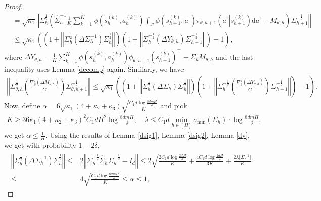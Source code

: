 \documentclass{article}
\numberwithin{equation}{section}
\begin{document}
\begin{proof}
\begin{align*}
    &=\sqrt{\kappa_1}\left\Vert\Sigma_h^{\frac{1}{2}}\left(\widehat{\Sigma}_h^{-1}\frac{1}{K}\sum_{k=1}^K\phi\left(s_h^{(k)},a_h^{(k)}\right)\int_{\mathcal{A}}\phi\left(s_{h+1}^{(k)},a^\prime\right)\pi_{\theta,h+1}\left(a^\prime\left\vert s_{h+1}^{(k)}\right.\right)\mathrm{d}a^\prime- M_{\theta,h}\right)\Sigma_{h+1}^{-\frac{1}{2}}\right\Vert\\
    &\leq\sqrt{\kappa_1}\left(\left(1+\left\Vert\Sigma_h^{\frac{1}{2}}\left(\Delta\Sigma_h^{-1}\right)\Sigma_h^{\frac{1}{2}}\right\Vert\right)\left(1+\left\Vert\Sigma_h^{-\frac{1}{2}}\left(\Delta Y_{\theta,h}\right)\Sigma_{h+1}^{-\frac{1}{2}}\right\Vert\right)-1\right),
\end{align*}
where $\Delta Y_{\theta,h}=\frac{1}{K}\sum_{k=1}^K\phi\left(s_h^{(k)},a_h^{(k)}\right)\phi_{\theta,h+1}\left(s_{h+1}^{(k)}\right)^\top-\Sigma_h M_{\theta,h}$ and the last inequality uses Lemma \ref{decomp} again. Similarly, we have
\begin{align*}
    \left\Vert\Sigma_{\theta,h}^{\frac{1}{2}}\left(\frac{\nabla_\theta^j\left(\Delta M_{\theta,h}\right)}{G}\right)\Sigma_{\theta,h+1}^{-\frac{1}{2}}\right\Vert\leq\sqrt{\kappa_1}\left(\left(1+\left\Vert\Sigma_h^{\frac{1}{2}}\left(\Delta\Sigma_h\right)\Sigma_h^{\frac{1}{2}}\right\Vert\right)\left(1+\left\Vert\Sigma_h^{-\frac{1}{2}}\left(\frac{\nabla_\theta^j\left(\Delta Y_{\theta,h}\right)}{G}\right)\Sigma_{h+1}^{-\frac{1}{2}}\right\Vert\right)-1\right).
\end{align*}
Now, define $\alpha=6\sqrt{\kappa_1}(4+\kappa_2+\kappa_3)\sqrt{\frac{C_1d\log\frac{8dmH}{\delta}}{K}}$ and pick
\begin{align*}
    K\geq 36\kappa_1(4+\kappa_2+\kappa_3)^2C_1dH^2\log\frac{8dmH}{\delta},\quad\lambda\leq C_1d\min_{h\in[H]}\sigma_{\textrm{min}}(\Sigma_h)\cdot\log\frac{8dmH}{\delta},
\end{align*}
we get $\alpha\leq\frac{1}{H}$. Using the results of Lemma \ref{dsig1}, Lemma \ref{dsig2}, Lemma \ref{dy}, we get with probability $1-2\delta$, 
\begin{align}
    \label{sig}
    \begin{aligned}
        \left\Vert\Sigma_h^{\frac{1}{2}}\left(\Delta\Sigma_h^{-1}\right)\Sigma_h^{\frac{1}{2}}\right\Vert\leq &2\left\Vert\Sigma_h^{-\frac{1}{2}}\widehat{\Sigma}_h\Sigma_h^{-\frac{1}{2}}-I_d\right\Vert\leq 2\sqrt{\frac{2C_1d\log\frac{2dH}{\delta}}{K}}+\frac{4C_1d\log\frac{2dH}{\delta}}{3K}+\frac{2\lambda\Vert\Sigma^{-1}_h\Vert}{K}\\
        \leq &4\sqrt{\frac{C_1d\log\frac{8dmH}{\delta}}{K}}\leq\alpha\leq 1, 

\end{aligned}
\end{align}
\end{proof}
\end{document}
